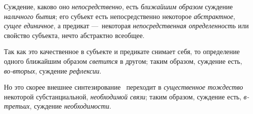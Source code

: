 \documentclass[twoside]{article}
\begin{document}
{{{{Суждение, каково оно
{\em непосредственно},
есть {\em ближайшим
образом} суждение
{\em наличного бытия};
его субъект есть непосредственно некоторое
{\em абстрактное},
{\em сущее единичное}, а
предикат —~некоторая
{\em непосредственная определенность}
или свойство субъекта, нечто абстрактно всеобщее.

Так как это качественное в субъекте и предикате снимает себя,
то определение одного ближайшим образом
{\em светится} в другом;
таким образом, суждение есть,
{\em во-вторых}, суждение
{\em рефлексии}.

Но это скорее внешнее
синтезирование~\label{bkm:bm30}
переходит в
{\em существенное тождество}
некоторой субстанциальной,
{\em необходимой связи};
таким образом, суждение есть,
{\em в-третьих}, суждение
{\em необходимости}.

}}}}
\end{document}
